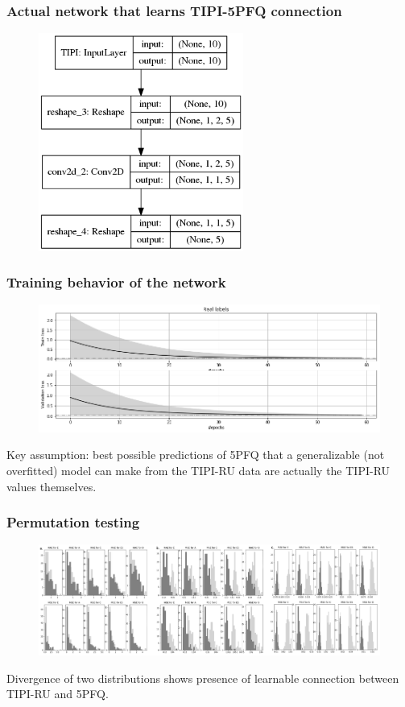 \documentclass[11pt,xcolor=x11names,compress]{beamer}
\renewcommand{\(}{\begin{columns}}
\renewcommand{\)}{\end{columns}}
\newcommand{\<}[1]{\begin{column}{#1}}
\renewcommand{\>}{\end{column}}
\begin{document}
\begin{frame}
	\frametitle{Actual network that learns TIPI-5PFQ connection}
	\begin{figure}
		\centering
		\includegraphics[width=0.6\textwidth]{tipinet.png}
	\end{figure}
\end{frame}

\begin{frame}
	\frametitle{Training behavior of the network}
	\begin{figure}
		\includegraphics[width=\textwidth]{histories.png}
	\end{figure}
	\centering
	Key assumption: best possible predictions of 5PFQ that a generalizable (not overfitted) model can make from the TIPI-RU data are actually the TIPI-RU values themselves.
\end{frame}

\begin{frame}
	\frametitle{Permutation testing}
	\begin{figure}
		\includegraphics[width=\textwidth]{divergence.png}
	\end{figure}
	\centering
	Divergence of two distributions shows presence of learnable connection between TIPI-RU and 5PFQ.
\end{frame}
\end{document}
